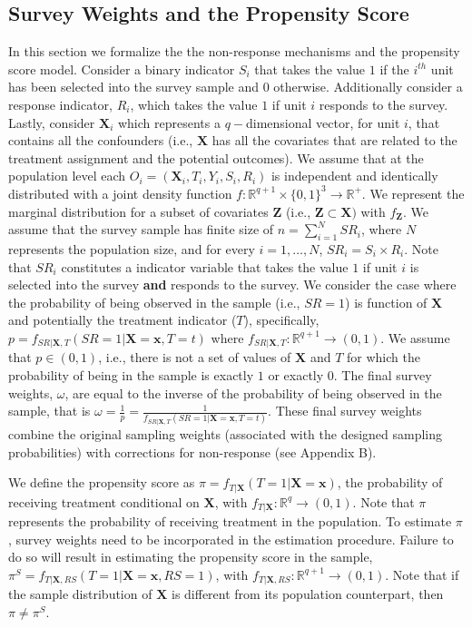 \documentclass[oupdraft]{bio}
\begin{document}
\subsection{Survey Weights and the Propensity Score}
\label{S2.22}
In this section we formalize the the non-response mechanisms and the propensity score model. Consider a binary indicator $S_{i}$ that takes the value $1$ if the $i^{th}$ unit has been selected into the survey sample and $0$ otherwise. Additionally consider a response indicator, $R_{i}$, which takes the value $1$ if unit $i$ responds to the survey.  Lastly, consider  $\mathbf{X}_{i}$ which represents a $q-$dimensional vector, for unit $i$, that contains all the confounders (i.e., $\mathbf{X}$ has all the covariates that are related to the treatment assignment and the potential outcomes).  We assume that at the population level each $O_{i}=\left(\mathbf{X}_{i},T_{i},Y_{i},S_{i},R_{i}\right)$ is independent and identically distributed with a joint density function
$f:\mathbb{R}^{q+1}\times\{0,1\}^{3}\rightarrow\mathbb{R}^{+}$.  We represent the marginal distribution for a subset of covariates $\mathbf{Z}$ (i.e., $\mathbf{Z} \subset \mathbf{X})$ with $f_{\mathbf{Z}}$. We assume that the survey sample has finite size of $n=\sum_{i=1}^{N}SR_{i}$, where $N$ represents the population size, and for every $i=1,\dots,N$, $SR_{i}=S_{i}\times R_{i}$. Note that $SR_{i}$ constitutes a indicator variable that takes the value $1$ if unit $i$ is selected into the survey \textbf{and} responds to the survey. We consider the case where the probability of being observed in the sample (i.e., $SR=1$) is function of $\mathbf{X}$ and potentially the treatment indicator ($T$), specifically, $p=f_{SR|\mathbf{X},T}\left(SR=1|\mathbf{X=x},T=t\right)$ where $f_{SR|\mathbf{X},T}:\mathbb{R}^{q+1}\rightarrow\left(0,1\right)$. We assume that $p\in (0,1)$,
i.e., there is not a set of values of $\mathbf{X}$ and $T$ for which
the probability of being in the sample is exactly $1$
or exactly $0$. The final survey weights,
$\omega$, are equal to the inverse of the probability of being observed in the sample, that is $\displaystyle\omega=\frac{1}{p}=\frac{1}{f_{SR|\mathbf{X},T}\left(SR=1|\mathbf{X=x},T=t\right)}$. These final survey weights combine the original sampling weights (associated with the designed sampling probabilities) with corrections for non-response (see Appendix B). 

We define the propensity score as $\pi=f_{T|\mathbf{X}}\left(T=1|\mathbf{X=x}\right)$, the probability of receiving treatment conditional on $\mathbf{X}$, with $f_{T|\mathbf{X}}:\mathbb{R} ^{q}\rightarrow\left(0,1\right)$. Note
that $\pi$ represents the probability of receiving treatment
in the population. To estimate $\pi$,  survey weights need to be incorporated in the estimation procedure. Failure to do so will result in estimating the propensity score in the sample, $\pi^{S}=f_{T|\mathbf{X},RS}\left(T=1|\mathbf{X=x}, RS=1\right)$, with $f_{T|\mathbf{X},RS}:\mathbb{R}^{q+1}\rightarrow\left(0,1\right)$.  Note that if the sample distribution of $\mathbf{X}$ is different from its population counterpart, then $\pi \neq \pi^S$.
\end{document}
